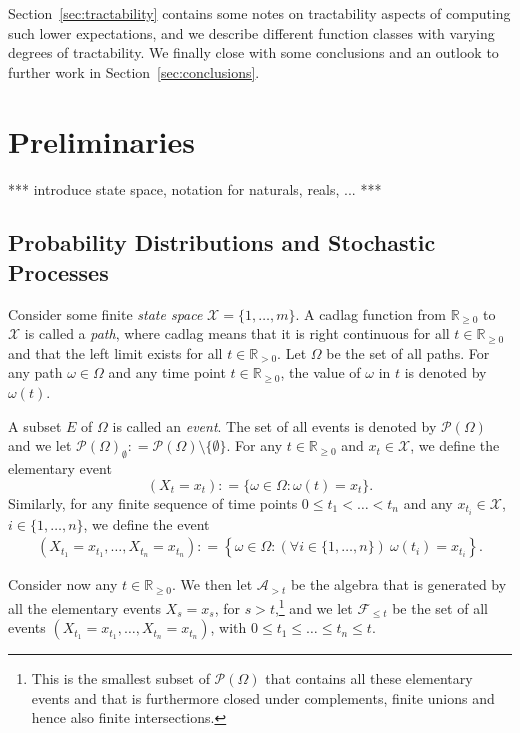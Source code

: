 \documentclass[10pt]{paper}
\theoremstyle{definition}
\newcommand{\reals}{\mathbb{R}}
\newcommand{\realspos}{\reals_{>0}}
\newcommand{\realsnonneg}{\reals_{\geq 0}}
\newcommand{\states}{\mathcal{X}}
\newcommand{\paths}{\Omega}
\newcommand{\path}{\omega}
\newcommand{\power}{\mathcal{P}(\paths)}
\newcommand{\nonemptypower}{\power_{\emptyset}}
\newcommand{\events}{\mathcal{E}}
\newcommand{\filter}[1][t]{\mathcal{F}_{#1}}
\newcommand{\coloneqq}{:\!=}
\begin{document}
Section~\ref{sec:tractability} contains some notes on tractability aspects of  computing such lower expectations, and we describe different function classes with varying degrees of tractability. We finally close with some conclusions and an outlook to further work in Section~\ref{sec:conclusions}.

\section{Preliminaries}\label{sec:prelim}

*** introduce state space, notation for naturals, reals, ... ***

\subsection{Probability Distributions and Stochastic Processes}
Consider some finite \emph{state space} $\states=\{1,\dots,m\}$. A cadlag function from $\realsnonneg$ to $\states$ is called a \emph{path}, where cadlag means that it is right continuous for all $t\in\realsnonneg$ and that the left limit exists for all $t\in\realspos$. Let $\paths$ be the set of all paths. For any path $\path\in\paths$ and any time point $t\in\realsnonneg$, the value of $\path$ in $t$ is denoted by $\path(t)$.

A subset $E$ of $\paths$ is called an \emph{event}. The set of all events is denoted by $\power$ and we let $\nonemptypower\coloneqq\power\setminus\{\emptyset\}$. For any $t\in\realsnonneg$ and $x_t\in\states$, we define the elementary event
\begin{equation*}
(X_t=x_t)\coloneqq\{\path\in\paths\colon\path(t)=x_t\}.
\end{equation*}
Similarly, for any finite sequence of time points $0\leq t_1<\dots<t_n$ and any $x_{t_i}\in\states$, $i\in\{1,\dots,n\}$, we define the event
\begin{align*}
\left(X_{t_1}=x_{t_1}, \dots, X_{t_n}=x_{t_n}\right)
\coloneqq%
\left\{\path\in\paths\colon(\forall i\in\{1,\dots,n\})~\path(t_i)=x_{t_i}\right\}.%
\end{align*}

Consider now any $t\in\realsnonneg$. We then let $\mathcal{A}_{>t}$ be the algebra that is generated by all the elementary events $X_s=x_s$, for $s> t$,\footnote{This is the smallest subset of $\power$ that contains all these elementary events and that is furthermore closed under complements, finite unions and hence also finite intersections.} and we let $\mathcal{F}_{\leq t}$ be the set of all events $\left(X_{t_1}=x_{t_1}, \dots, X_{t_n}=x_{t_n}\right)$, with $0\leq t_1\leq\dots\leq t_n\leq t$.%
\end{document}

